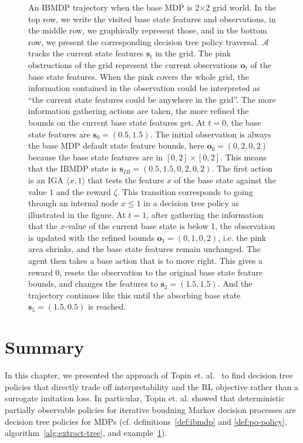 \begin{figure}
\begin{tikzpicture}[scale=0.6]
    
\end{tikzpicture}
\caption{An IBMDP trajectory when the base MDP is 2$\times$2 grid world. In the top row, we write the visited base state features and observations, in the middle row, we graphically represent those, and in the bottom row, we present the corresponding decision tree policy traversal.
$\mathcal{A}$ tracks the current state features $\boldsymbol{s}_t$ in the grid.
The pink obstructions of the grid represent the current observations $\boldsymbol{o}_t$ of the base state features.
When the pink covers the whole grid, the information contained in the observation could be interpreted as ``the current state features could be anywhere in the grid''.
The more information gathering actions are taken, the more refined the bounds on the current base state features get.
At $t=0$, the base state features are $\boldsymbol{s}_0 = (0.5, 1.5)$. 
The initial observation is always the base MDP default state feature bounds, here $\boldsymbol{o}_0=(0, 2, 0, 2)$ because the base state features are in $[0, 2] \times [0, 2]$.
This means that the IBMDP state is $\boldsymbol{s}_{IB} = (0.5, 1.5, 0, 2, 0, 2)$.
The first action is an IGA $\langle x, 1\rangle$ that tests the feature $x$ of the base state against the value $1$ and the reward $\zeta$. 
This transition corresponds to going through an internal node $ x\leq 1$ in a decision tree policy as illustrated in the figure. 
At $t=1$, after gathering the information that the $x$-value of the current base state is below 1, the observation is updated with the refined bounds $\boldsymbol{o}_1=(0, 1, 0, 2)$, i.e. the pink area shrinks, and the base state features remain unchanged.
The agent then takes a base action that is to move right. 
This gives a reward 0, resets the observation to the original base state feature bounds, and changes the features to $\boldsymbol{s}_2=(1.5, 1.5)$. And the trajectory continues like this until the absorbing base state $\boldsymbol{s}_5=(1.5, 0.5)$ is reached.}
\label{example:ibmdp}
\end{figure}

\section{Summary}
In this chapter, we presented the approach of Topin et. al.~\cite{topin2021iterative} to find decision tree policies that directly trade off interpretability and the RL objective rather than a surrogate imitation loss.
In particular, Topin et. al. showed that deterministic partially observable policies for iterative boudning Markov decision processes are decision tree policies for MDPs (cf. definitions~\ref{def:ibmdp} and \ref{def:po-policy}, algorithm~\ref{alg:extract-tree}, and example~\ref{example:ibmdp}).

